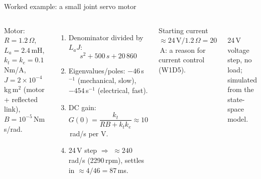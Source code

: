 \documentclass[aspectratio=169,10pt]{beamer}
\begin{document}
\begin{frame}{Worked example: a small joint servo motor}
\begin{columns}[T]
\footnotesize
Motor: $R=1.2\,\Omega$, $L_a=2.4$\,mH, $k_t=k_e=0.1$\,Nm/A, $J=2\times10^{-4}$\,kg\,m$^2$ (motor + reflected link), $B=10^{-5}$\,Nm\,s/rad.
\begin{enumerate}
  \item Denominator divided by $L_aJ$:
  \[s^2+500\,s+20\,860\]
  \item Eigenvalues/poles: $-46$\,s$^{-1}$ (mechanical, slow), $-454$\,s$^{-1}$ (electrical, fast).
  \item DC gain: $G(0)=\dfrac{k_t}{RB+k_tk_e}\approx10$\,rad/s per V.
  \item 24\,V step $\Rightarrow$ $\approx240$\,rad/s (2290\,rpm), settles in $\approx4/46=87$\,ms.
\end{enumerate}
Starting current $\approx24\,\mathrm{V}/1.2\,\Omega=20$\,A: a reason for current control (W1D5).
\centering
{}\\
\footnotesize 24\,V voltage step, no load; simulated from the state-space model.
\end{columns}
\end{frame}
\end{document}
